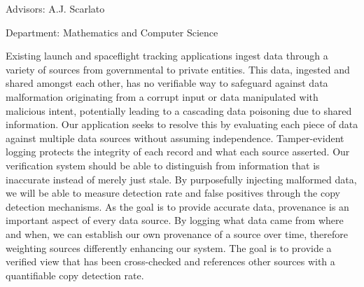 \documentclass[12pt]{article}
\newcommand{\myAdvisorOne}{A.J. Scarlato}
\newcommand{\myDepartment}{Mathematics and Computer Science}
\begin{document}
\vspace{0.5in}

Advisors: \myAdvisorOne

Department: \myDepartment
\singlespacing

\vspace{0.5in}

\doublespacing

Existing launch and spaceflight tracking applications ingest data through a variety of sources from governmental to private entities.
This data, ingested and shared amongst each other, has no verifiable way to safeguard against data malformation originating from a corrupt input or data manipulated with malicious intent, potentially leading to a cascading data poisoning due to shared information.
Our application seeks to resolve this by evaluating each piece of data against multiple data sources without assuming independence.
Tamper-evident logging protects the integrity of each record and what each source asserted.
Our verification system should be able to distinguish from information that is inaccurate instead of merely just stale.
By purposefully injecting malformed data, we will be able to measure detection rate and false positives through the copy detection mechanisms.
As the goal is to provide accurate data, provenance is an important aspect of every data source.
By logging what data came from where and when, we can establish our own provenance of a source over time, therefore weighting sources differently enhancing our system.
The goal is to provide a verified view that has been cross-checked and references other sources with a quantifiable copy detection rate.

\newpage

\end{document}

